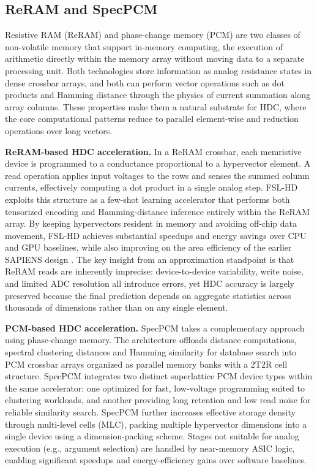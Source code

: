 \subsection{ReRAM and SpecPCM}

Resistive RAM (ReRAM) and phase-change memory (PCM) are two classes of non-volatile memory that support in-memory computing, the execution of arithmetic directly within the memory array without moving data to a separate processing unit. Both technologies store information as analog resistance states in dense crossbar arrays, and both can perform vector operations such as dot products and Hamming distance through the physics of current summation along array columns. These properties make them a natural substrate for HDC, where the core computational patterns reduce to parallel element-wise and reduction operations over long vectors.

\textbf{ReRAM-based HDC acceleration.} In a ReRAM crossbar, each memristive device is programmed to a conductance proportional to a hypervector element. A read operation applies input voltages to the rows and senses the summed column currents, effectively computing a dot product in a single analog step. FSL-HD \cite{ReRAMAcc} exploits this structure as a few-shot learning accelerator that performs both tensorized encoding and Hamming-distance inference entirely within the ReRAM array. By keeping hypervectors resident in memory and avoiding off-chip data movement, FSL-HD achieves substantial speedups and energy savings over CPU and GPU baselines, while also improving on the area efficiency of the earlier SAPIENS design \cite{SAPIENS}. The key insight from an approximation standpoint is that ReRAM reads are inherently imprecise: device-to-device variability, write noise, and limited ADC resolution all introduce errors, yet HDC accuracy is largely preserved because the final prediction depends on aggregate statistics across thousands of dimensions rather than on any single element.

\textbf{PCM-based HDC acceleration.} SpecPCM \cite{SpecPCM2024} takes a complementary approach using phase-change memory. The architecture offloads distance computations, spectral clustering distances and Hamming similarity for database search into PCM crossbar arrays organized as parallel memory banks with a 2T2R cell structure. SpecPCM integrates two distinct superlattice PCM device types within the same accelerator: one optimized for fast, low-voltage programming suited to clustering workloads, and another providing long retention and low read noise for reliable similarity search. SpecPCM further increases effective storage density through multi-level cells (MLC), packing multiple hypervector dimensions into a single device using a dimension-packing scheme. Stages not suitable for analog execution (e.g., argument selection) are handled by near-memory ASIC logic, enabling significant speedups and energy-efficiency gains over software baselines.

